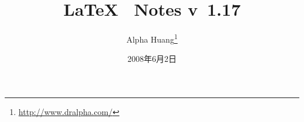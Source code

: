 \documentclass[11pt]{book}
\renewcommand{\chaptername}{第\CJKnumber{\thechapter}章}
\begin{document}

\frontmatter

\title{\Huge\LaTeX~ Notes v~1.17}
\author{Alpha Huang\footnote{\url{http://www.dralpha.com/}}}
\date{2008年6月2日}
\maketitle



\renewcommand{\chaptermark}[1]{\markboth{#1}{}}


\tableofcontents

\mainmatter
\renewcommand{\chaptermark}[1]{\markboth{\chaptername\ #1}{}}
\renewcommand{\sectionmark}[1]{\markright{\thesection\ #1}}










\backmatter



\newpage

\end{document}
